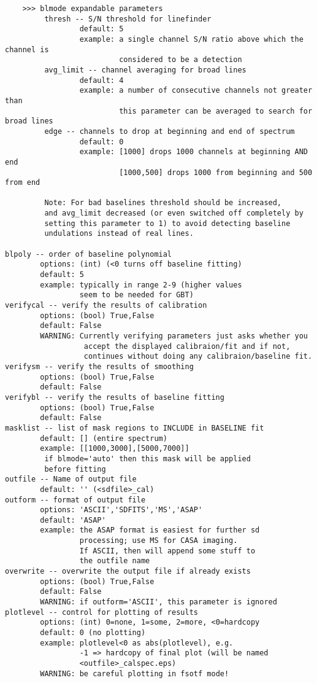 \begin{verbatim}
    >>> blmode expandable parameters
         thresh -- S/N threshold for linefinder
                 default: 5
                 example: a single channel S/N ratio above which the channel is
                          considered to be a detection
         avg_limit -- channel averaging for broad lines
                 default: 4
                 example: a number of consecutive channels not greater than
                          this parameter can be averaged to search for broad lines
         edge -- channels to drop at beginning and end of spectrum
                 default: 0
                 example: [1000] drops 1000 channels at beginning AND end
                          [1000,500] drops 1000 from beginning and 500 from end

         Note: For bad baselines threshold should be increased,
         and avg_limit decreased (or even switched off completely by
         setting this parameter to 1) to avoid detecting baseline
         undulations instead of real lines.

blpoly -- order of baseline polynomial
        options: (int) (<0 turns off baseline fitting)
        default: 5
        example: typically in range 2-9 (higher values
                 seem to be needed for GBT)
verifycal -- verify the results of calibration
        options: (bool) True,False
        default: False
        WARNING: Currently verifying parameters just asks whether you 
                  accept the displayed calibraion/fit and if not, 
                  continues without doing any calibraion/baseline fit.
verifysm -- verify the results of smoothing
        options: (bool) True,False
        default: False
verifybl -- verify the results of baseline fitting
        options: (bool) True,False
        default: False
masklist -- list of mask regions to INCLUDE in BASELINE fit
        default: [] (entire spectrum)
        example: [[1000,3000],[5000,7000]]
         if blmode='auto' then this mask will be applied
         before fitting
outfile -- Name of output file
        default: '' (<sdfile>_cal)
outform -- format of output file
        options: 'ASCII','SDFITS','MS','ASAP'
        default: 'ASAP'
        example: the ASAP format is easiest for further sd
                 processing; use MS for CASA imaging.
                 If ASCII, then will append some stuff to
                 the outfile name
overwrite -- overwrite the output file if already exists
        options: (bool) True,False
        default: False
        WARNING: if outform='ASCII', this parameter is ignored
plotlevel -- control for plotting of results
        options: (int) 0=none, 1=some, 2=more, <0=hardcopy
        default: 0 (no plotting)
        example: plotlevel<0 as abs(plotlevel), e.g.
                 -1 => hardcopy of final plot (will be named
                 <outfile>_calspec.eps)
        WARNING: be careful plotting in fsotf mode!
\end{verbatim}
    
